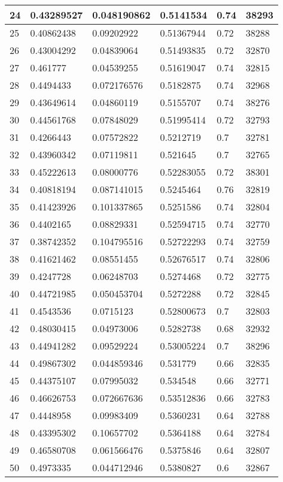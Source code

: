 \begin{longtable}{|l|l|l|l|l|l|}
24 & 0.43289527 & 0.048190862 & 0.5141534 & 0.74 & 38293 \\ \hline 
25 & 0.40862438 & 0.09202922 & 0.51367944 & 0.72 & 38288 \\ \hline 
26 & 0.43004292 & 0.04839064 & 0.51493835 & 0.72 & 32870 \\ \hline 
27 & 0.461777 & 0.04539255 & 0.51619047 & 0.74 & 32815 \\ \hline 
28 & 0.4494433 & 0.072176576 & 0.5182875 & 0.74 & 32968 \\ \hline 
29 & 0.43649614 & 0.04860119 & 0.5155707 & 0.74 & 38276 \\ \hline 
30 & 0.44561768 & 0.07848029 & 0.51995414 & 0.72 & 32793 \\ \hline 
31 & 0.4266443 & 0.07572822 & 0.5212719 & 0.7 & 32781 \\ \hline 
32 & 0.43960342 & 0.07119811 & 0.521645 & 0.7 & 32765 \\ \hline 
33 & 0.45222613 & 0.08000776 & 0.52283055 & 0.72 & 38301 \\ \hline 
34 & 0.40818194 & 0.087141015 & 0.5245464 & 0.76 & 32819 \\ \hline 
35 & 0.41423926 & 0.101337865 & 0.5251586 & 0.74 & 32804 \\ \hline 
36 & 0.4402165 & 0.08829331 & 0.52594715 & 0.74 & 32770 \\ \hline 
37 & 0.38742352 & 0.104795516 & 0.52722293 & 0.74 & 32759 \\ \hline 
38 & 0.41621462 & 0.08551455 & 0.52676517 & 0.74 & 32806 \\ \hline 
39 & 0.4247728 & 0.06248703 & 0.5274468 & 0.72 & 32775 \\ \hline 
40 & 0.44721985 & 0.050453704 & 0.5272288 & 0.72 & 32845 \\ \hline 
41 & 0.4543536 & 0.0715123 & 0.52800673 & 0.7 & 32803 \\ \hline 
42 & 0.48030415 & 0.04973006 & 0.5282738 & 0.68 & 32932 \\ \hline 
43 & 0.44941282 & 0.09529224 & 0.53005224 & 0.7 & 38296 \\ \hline 
44 & 0.49867302 & 0.044859346 & 0.531779 & 0.66 & 32835 \\ \hline 
45 & 0.44375107 & 0.07995032 & 0.534548 & 0.66 & 32771 \\ \hline 
46 & 0.46626753 & 0.072667636 & 0.53512836 & 0.66 & 32783 \\ \hline 
47 & 0.4448958 & 0.09983409 & 0.5360231 & 0.64 & 32788 \\ \hline 
48 & 0.43395302 & 0.10657702 & 0.5364188 & 0.64 & 32784 \\ \hline 
49 & 0.46580708 & 0.061566476 & 0.5375846 & 0.64 & 32807 \\ \hline 
50 & 0.4973335 & 0.044712946 & 0.5380827 & 0.6 & 32867 \\ \hline 
\end{longtable}